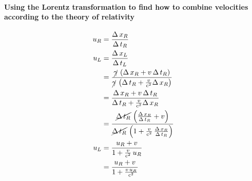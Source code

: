\documentclass[pagesize,headsepline,10pt,parskip=half]{scrreprt}
\newcommand*\mdelta[1]{\ensuremath{\mathrm{\Delta\,}#1}}
\newcommand{\const}[1]{\ensuremath{\mathrm{#1}}}
\renewcommand{\c}{\const{c}}
\begin{document}
      \paragraph{Using the Lorentz transformation to find how to combine velocities according to the theory of relativity}
        \begin{align*}
          u_R &= \frac{\mdelta{x_R}}{\mdelta{t_R}}\\
          u_L
            &= \frac{\mdelta{x_L}}{\mdelta{t_L}}\\
            &= \frac{\cancel{\gamma} \, \left(\mdelta{x_R} + v \, \mdelta{t_R}\right)}
                    {\cancel{\gamma} \, \left(\mdelta{t_R} + \frac{v}{\c^2} \mdelta{x_R}\right)}\\
            &= \frac{\mdelta{x_R} + v \, \mdelta{t_R}}
                    {\mdelta{t_R} + \frac{v}{\c^2} \mdelta{x_R}}\\
            &= \frac{\cancel{\mdelta{t_R}} \, \left(\frac{\mdelta{x_R}}{\mdelta{t_R}} + v\right)}
                    {\cancel{\mdelta{t_R}} \, \left(1 + \frac{v}{\c^2} \, \frac{\mdelta{x_R}}{\mdelta{t_R}}\right)}\\
          u_L &= \frac{u_R + v}{1 + \frac{v}{\c^2} \, u_R}\\
              &= \frac{u_R + v}{1 + \frac{v \, u_R}{\c^2}}
        \end{align*}
\end{document}
